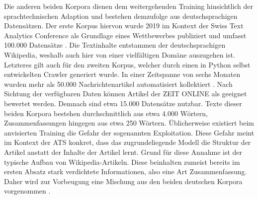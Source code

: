 \noindent
Die anderen beiden Korpora dienen dem weitergehenden Training hinsichtlich der sprachtechnischen Adaption und bestehen demzufolge aus deutschsprachigen Datensätzen. Der erste Korpus hiervon wurde 2019 im Kontext der Swiss Text Analytics Conference als Grundlage eines Wettbewerbes publiziert und umfasst 100.000 Datensätze \cite{CIE19}. Die Textinhalte entstammen der deutschsprachigen Wikipedia, weshalb auch hier von einer vielfältigen Domäne auszugehen ist. Letzteres gilt auch für den zweiten Korpus, welcher durch einen in Python selbst entwickelten Crawler generiert wurde. In einer Zeitspanne von sechs Monaten wurden mehr als 50.000 Nachrichtenartikel automatisiert kollektiert \cite[S.~79,~83,~416]{BIR09}. Nach Sichtung der verfügbaren Daten können Artikel der ZEIT ONLINE als geeignet bewertet werden. Demnach sind etwa 15.000 Datensätze nutzbar. Texte dieser beiden Korpora bestehen durchschnittlich aus etwa 4.000 Wörtern, Zusammenfassungen hingegen aus etwa 250 Wörtern. Üblicherweise existiert beim anvisierten Training die Gefahr der sogenannten Exploitation. Diese Gefahr meint im Kontext der \ac{ATS} konkret, dass das zugrundeliegende Modell die Struktur der Artikel anstatt der Inhalte der Artikel lernt. Grund für diese Annahme ist der typische Aufbau von Wikipedia-Artikeln. Diese beinhalten zumeist bereits im ersten Absatz stark verdichtete Informationen, also eine Art Zusammenfassung. Daher wird zur Vorbeugung eine Mischung aus den beiden deutschen Korpora vorgenommen \cite[S.~42]{BIR09}.\\
